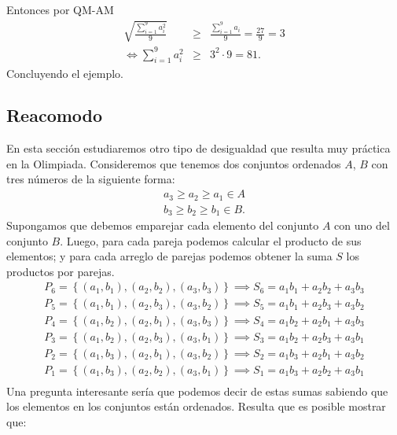 \documentclass[11pt]{scrartcl}
\begin{document}
\begin{soln}
\noindent
Entonces por QM-AM 
\begin{eqnarray*}
 \sqrt{\frac{\sum_{i=1}^9 a_i^2}{9}} &\geq& \frac{\sum_{i=1}^9 a_i}{9}=\frac{27}{9}=3 \\
\Leftrightarrow \sum_{i=1}^9 a_i^2 &\geq& 3^2\cdot 9 =81.
\end{eqnarray*}
Concluyendo el ejemplo.
\end{soln}

\subsection{Reacomodo}
\noindent
En esta secci\'on estudiaremos otro tipo de desigualdad que resulta muy pr\'actica en la Olimpiada. Consideremos que tenemos dos conjuntos ordenados $A$, $B$ con tres n\'umeros de la siguiente forma:
\begin{eqnarray*}
    a_3 \geq a_2 \geq a_1 \in A\\
    b_3 \geq b_2 \geq b_1 \in B.
\end{eqnarray*}
Supongamos que debemos emparejar cada elemento del conjunto $A$ con uno del conjunto $B$. Luego, para cada pareja podemos calcular el producto de sus elementos; y para cada arreglo de parejas podemos obtener la suma $S$ los productos por parejas. 
\begin{eqnarray*}
    P_6 = \left\{\left(a_1, b_1\right), \left(a_2, b_2\right), \left(a_3, b_3\right)\right\} \implies S_6 = a_1b_1 + a_2b_2 + a_3b_3\\
    P_5 = \left\{\left(a_1, b_1\right), \left(a_2, b_3\right), \left(a_3, b_2\right)\right\} \implies S_5 = a_1b_1 + a_2b_3 + a_3b_2\\
    P_4 = \left\{\left(a_1, b_2\right), \left(a_2, b_1\right), \left(a_3, b_3\right)\right\} \implies S_4 = a_1b_2 + a_2b_1 + a_3b_3\\
    P_3 = \left\{\left(a_1, b_2\right), \left(a_2, b_3\right), \left(a_3, b_1\right)\right\} \implies S_3 = a_1b_2 + a_2b_3 + a_3b_1\\
    P_2 = \left\{\left(a_1, b_3\right), \left(a_2, b_1\right), \left(a_3, b_2\right)\right\} \implies S_2 = a_1b_3 + a_2b_1 + a_3b_2\\
    P_1 = \left\{\left(a_1, b_3\right), \left(a_2, b_2\right), \left(a_3, b_1\right)\right\} \implies S_1 = a_1b_3 + a_2b_2 + a_3b_1\\
\end{eqnarray*}
Una pregunta interesante ser\'ia que podemos decir de estas sumas sabiendo que los elementos en los conjuntos est\'an ordenados. Resulta que es posible mostrar que:
\end{document}
